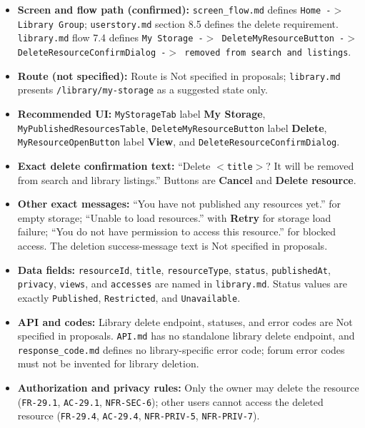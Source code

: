 \documentclass[12pt]{article}
\begin{document}
\begin{itemize}
\item \textbf{Screen and flow path (confirmed):} \texttt{screen\_flow.md} defines \texttt{Home -$>$ Library Group}; \texttt{userstory.md} section 8.5 defines the delete requirement. \texttt{library.md} flow 7.4 defines \texttt{My Storage -$>$ DeleteMyResourceButton -$>$ DeleteResourceConfirmDialog -$>$ removed from search and listings}.
\item \textbf{Route (not specified):} Route is Not specified in proposals; \texttt{library.md} presents \texttt{/library/my-storage} as a suggested state only.
\item \textbf{Recommended UI:} \texttt{MyStorageTab} label \textbf{My Storage}, \texttt{MyPublishedResourcesTable}, \texttt{DeleteMyResourceButton} label \textbf{Delete}, \texttt{MyResourceOpenButton} label \textbf{View}, and \texttt{DeleteResourceConfirmDialog}.
\item \textbf{Exact delete confirmation text:} “Delete \texttt{$<$title$>$}? It will be removed from search and library listings.” Buttons are \textbf{Cancel} and \textbf{Delete resource}.
\item \textbf{Other exact messages:} “You have not published any resources yet.” for empty storage; “Unable to load resources.” with \textbf{Retry} for storage load failure; “You do not have permission to access this resource.” for blocked access. The deletion success-message text is Not specified in proposals.
\item \textbf{Data fields:} \texttt{resourceId}, \texttt{title}, \texttt{resourceType}, \texttt{status}, \texttt{publishedAt}, \texttt{privacy}, \texttt{views}, and \texttt{accesses} are named in \texttt{library.md}. Status values are exactly \texttt{Published}, \texttt{Restricted}, and \texttt{Unavailable}.
\item \textbf{API and codes:} Library delete endpoint, statuses, and error codes are Not specified in proposals. \texttt{API.md} has no standalone library delete endpoint, and \texttt{response\_code.md} defines no library-specific error code; forum error codes must not be invented for library deletion.
\item \textbf{Authorization and privacy rules:} Only the owner may delete the resource (\texttt{FR-29.1}, \texttt{AC-29.1}, \texttt{NFR-SEC-6}); other users cannot access the deleted resource (\texttt{FR-29.4}, \texttt{AC-29.4}, \texttt{NFR-PRIV-5}, \texttt{NFR-PRIV-7}).
\end{itemize}
\par\medskip
\end{document}
